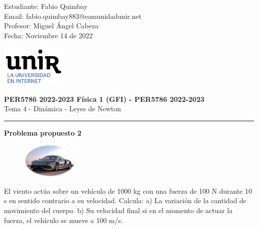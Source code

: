 \documentclass[11pt,letterpaper]{article}
\begin{document}
\pagestyle{plain}

\begin{flushleft}
Estudiante: Fabio Quimbay\\
Email: fabio.quimbay883@comunidadunir.net\\
Profesor: Miguel Ángel Cabeza\\
Fecha: Noviembre 14 de 2022\\
\end{flushleft}

\begin{flushright}\vspace{-20mm}
\includegraphics[height=2cm]{logo.png}
\end{flushright}
 
\begin{center}\vspace{0cm}
\textbf{\large PER5786 2022-2023  Física 1 (GFI) - PER5786 2022-2023}\\
 Tema 4 - Dinámica - Leyes de Newton
\end{center}

 
\rule{\linewidth}{0.1mm}

\bigskip
\bigskip

\textbf{Problema propuesto 2}\\

\begin{figure}
\begin{center}
\includegraphics[width=0.25\textwidth]{problema_2.png}
\end{center}
\end{figure}

El viento actúa sobre un vehículo de 1000 kg con una fuerza de 100 N durante 10 s en sentido contrario a su velocidad. Calcula: a) La variación de la cantidad de movimiento del cuerpo. b) Su velocidad final si en el momento de actuar la fuerza, el vehículo se mueve a 100 m/s.\\
\end{document}

